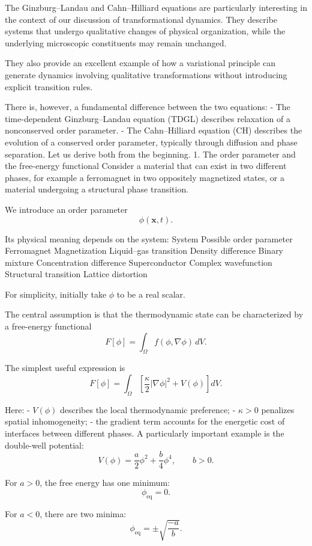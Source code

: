 The Ginzburg–Landau and Cahn–Hilliard equations are particularly interesting in the context of our discussion of transformational dynamics. They describe systems that undergo qualitative changes of physical organization, while the underlying microscopic constituents may remain unchanged.

They also provide an excellent example of how a variational principle can generate dynamics involving qualitative transformations without introducing explicit transition rules.

There is, however, a fundamental difference between the two equations:
- The time-dependent Ginzburg–Landau equation (TDGL) describes relaxation of a nonconserved order parameter.
- The Cahn–Hilliard equation (CH) describes the evolution of a conserved order parameter, typically through diffusion and phase separation.
Let us derive both from the beginning.
1. The order parameter and the free-energy functional
Consider a material that can exist in two different phases, for example a ferromagnet in two oppositely magnetized states, or a material undergoing a structural phase transition.

We introduce an order parameter
\[
\phi(\mathbf x,t).
\]

Its physical meaning depends on the system:
System	Possible order parameter
Ferromagnet	Magnetization
Liquid–gas transition	Density difference
Binary mixture	Concentration difference
Superconductor	Complex wavefunction
Structural transition	Lattice distortion

For simplicity, initially take \(\phi\) to be a real scalar.

The central assumption is that the thermodynamic state can be characterized by a free-energy functional
\[
F[\phi]=\int_\Omega f(\phi,\nabla\phi)\,dV.
\]

The simplest useful expression is
\[
\boxed{
F[\phi]=
\int_\Omega
\left[
\frac{\kappa}{2}|\nabla\phi|^2+
V(\phi)
\right]dV.
}
\]

Here:
- \(V(\phi)\) describes the local thermodynamic preference;
- \(\kappa>0\) penalizes spatial inhomogeneity;
- the gradient term accounts for the energetic cost of interfaces between different phases.
A particularly important example is the double-well potential:
\[
\boxed{
V(\phi)=
\frac{a}{2}\phi^2+
\frac{b}{4}\phi^4,
\qquad b>0.
}
\]

For \(a>0\), the free energy has one minimum:
\[
\phi_{\mathrm{eq}}=0.
\]

For \(a<0\), there are two minima:
\[
\phi_{\mathrm{eq}}
=\pm\sqrt{\frac{-a}{b}}.
\]























